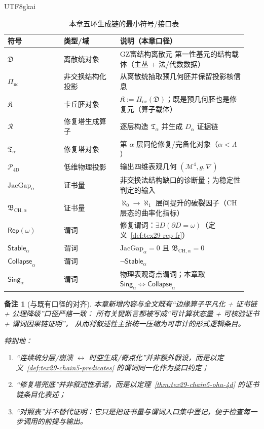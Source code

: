 \documentclass[12pt]{article}
\newtheorem{remark}{备注}[section]
\newcommand{\GZMonFull}{\texorpdfstring{GZ富结构离散元}{GZ富结构离散元}}
\begin{document}
\begin{CJK*}{UTF8}{gkai}
\begin{table}[htbp]
\centering
{\footnotesize
\setlength{\tabcolsep}{2pt}
\renewcommand{\arraystretch}{1.2}
\begin{tabular}{|p{0.22\linewidth}|p{0.22\linewidth}|p{0.50\linewidth}|}
\hline
\textbf{符号} & \textbf{类型/域} & \textbf{说明（本章口径）} \\
\hline
$\mathfrak{D}$ & 离散统对象 & \GZMonFull{} 第一性基元的结构载体（主丛 + 法/代数数据） \\
\hline
$\Pi_{\mathrm{nc}}$ & 非交换结构化投影 & 从离散统抽取预几何胚并保留投影核信息 \\
\hline
$\mathfrak{K}$ & 卡丘胚对象 & $\mathfrak{K}:=\Pi_{\mathrm{nc}}(\mathfrak{D})$；既是预几何胚也是修复元（算子载体） \\
\hline
$\mathcal{R}$ & 修复塔生成算子 & 逐层构造 $\mathfrak{T}_{\alpha}$ 并生成 $D_{\alpha}$ 证据链 \\
\hline
$\mathfrak{T}_{\alpha}$ & 修复塔对象 & 第 $\alpha$ 层同伦修复/完备化对象（$\alpha<\Lambda$） \\
\hline
$\mathcal{P}_{\mathrm{4D}}$ & 低维物理投影 & 输出四维表观几何 $(\mathcal{M}^4,g,\nabla)$ \\
\hline
$\mathrm{JacGap}_{\alpha}$ & 证书量 & 非交换法结构缺口的诊断量；为稳定性判定的输入 \\
\hline
$\mathfrak{B}_{\mathrm{CH},\alpha}$ & 证书量 & $\aleph_0\to\aleph_1$ 层间提升的破裂因子（CH 层态的曲率化指标） \\
\hline
$\mathsf{Rep}(\omega)$ & 谓词 & 修复谓词：$\exists D(\partial D=\omega)$（定义~\ref{def:tex29-rep-fr}） \\
\hline
$\mathsf{Stable}_{\alpha}$ & 谓词 & $\mathrm{JacGap}_{\alpha}=0$ 且 $\mathfrak{B}_{\mathrm{CH},\alpha}=0$ \\
\hline
$\mathsf{Collapse}_{\alpha}$ & 谓词 & $\neg\mathsf{Stable}_{\alpha}$ \\
\hline
$\mathsf{Sing}_{\alpha}$ & 谓词 & 物理表观奇点谓词；本章取 $\mathsf{Sing}_{\alpha}\Longleftrightarrow\mathsf{Collapse}_{\alpha}$ \\
\hline
\end{tabular}
}
\caption{本章五环生成链的最小符号/接口表}
\label{tab:tex29-chain5-symbols}
\end{table}

\begin{remark}[与既有口径的对齐]
本章新增内容与全文既有“边缘算子平凡化 + 证书链 + 公理降级”口径严格一致：
所有关键断言都被写成“可计算状态量 + 可核验证书 + 谓词因果链证明”，
从而将叙述性主张统一压缩为可审计的形式逻辑条目。
\par
特别地：
\begin{enumerate}
  \item “连续统分层/崩溃 $\leftrightarrow$ 时空生成/奇点化”并非额外假设，而是以定义~\ref{def:tex29-chain5-predicates} 的谓词同一化作为接口约定；
  \item “修复塔兜底”并非叙述性承诺，而是以定理~\ref{thm:tex29-chain5-ohu-4d} 的证书链条目化表述；
  \item “对照表”并不替代证明：它只是把证书量与谓词入口集中登记，便于检查每一步调用的前提与输出。
\end{enumerate}
\end{remark}


\end{CJK*}
\end{document}
